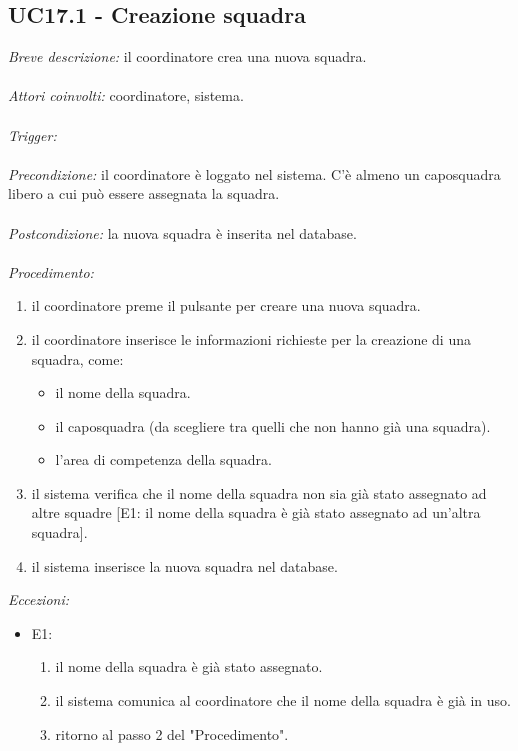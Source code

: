 \subsection{UC17.1 - Creazione squadra}
\textit{Breve descrizione:} il coordinatore crea una nuova squadra. 
\\
\\
\textit{Attori coinvolti:} coordinatore, sistema.
\\
\\
\textit{Trigger:}
\\
\\
\textit{Precondizione:} il coordinatore è loggato nel sistema.
C'è almeno un caposquadra libero a cui può essere assegnata la squadra.
\\
\\
\textit{Postcondizione:} la nuova squadra è inserita nel database.
\\
\\
\textit{Procedimento:}
\begin{enumerate}
	\item il coordinatore preme il pulsante per creare una nuova squadra.
	\item il coordinatore inserisce le informazioni richieste per la creazione di una squadra, come:
	\begin{itemize}
		\item il nome della squadra.
		\item il caposquadra (da scegliere tra quelli che non hanno già una squadra).
		\item l'area di competenza della squadra.
	\end{itemize}
	\item il sistema verifica che il nome della squadra non sia già stato assegnato ad altre squadre [E1: il nome della squadra è già stato assegnato ad un'altra squadra].
	\item il sistema inserisce la nuova squadra nel database. 
\end{enumerate}

\textit{Eccezioni:}
\begin{itemize}
	\item E1:
	\begin{enumerate}
		\item il nome della squadra è già stato assegnato.
		\item il sistema comunica al coordinatore che il nome della squadra è già in uso.
		\item ritorno al passo 2 del "Procedimento".
	\end{enumerate}
\end{itemize}



